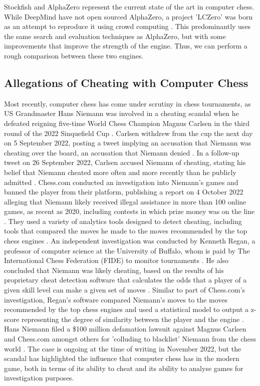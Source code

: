 \documentclass[%
 superscriptaddress,
showpacs,preprintnumbers,
 amsmath,
 amssymb,
 aps,
 pra,
showkeys,
onecolumn,
notitlepage,
11pt,
tightenlines      %
]{revtex4-1}
\begin{document}
Stockfish and AlphaZero represent the current state of the art in computer chess. While DeepMind have not open sourced AlphaZero, a project 'LCZero' was born as an attempt to reproduce it using crowd computing \cite{maharaj2022chess}. This predominantly uses the same search and evaluation techniques as AlphaZero, but with some improvements that improve the strength of the engine. Thus, we can perform a rough comparison between these two engines.

\subsection{Allegations of Cheating with Computer Chess}
Most recently, computer chess has come under scrutiny in chess tournaments, as US Grandmaster Hans Niemann was involved in a cheating scandal when he defeated reigning five-time World Chess Champion Magnus Carlsen in the third round of the 2022 Sinquefield Cup \cite{niemannDefeatsCarlsen}. Carlsen withdrew from the cup the next day on 5 September 2022, posting a tweet implying an accusation that Niemann was cheating over the board, an accusation that Niemann denied \cite{niemannCheatingAllegations}. In a follow-up tweet on 26 September 2022, Carlsen accused Niemann of cheating, stating his belief that Niemann cheated more often and more recently than he publicly admitted \cite{niemannCheatingAllegations2}. Chess.com conducted an investigation into Niemann's games and banned the player from their platform, publishing a report on 4 October 2022 alleging that Niemann likely received illegal assistance in more than 100 online games, as recent as 2020, including contests in which prize money was on the line \cite{niemannCheatingChessComReport}. They used a variety of analytics tools designed to detect cheating, including tools that compared the moves he made to the moves recommended by the top chess engines \cite{niemannCheatingChessComReport}. An independent investigation was conducted by Kenneth Regan, a professor of computer science at the University of Buffalo, whom is paid by The International Chess Federation (FIDE) to monitor tournaments \cite{niemannCheatingReganReport}. He also concluded that Niemann was likely cheating, based on the results of his proprietary cheat detection software that calculates the odds that a player of a given skill level can make a given set of moves \cite{niemannCheatingReganReport}. Similar to part of Chess.com's investigation, Regan's software compared Niemann's moves to the moves recommended by the top chess engines and used a statistical model to output a z-score representing the degree of similarity between the player and the engine \cite{niemannCheatingReganReport}. Hans Niemann filed a \$100 million defamation lawsuit against Magnus Carlsen and Chess.com amongst others for 'colluding to blacklist' Niemann from the chess world \cite{niemannCheatingDefamationLawsuit}. The case is ongoing at the time of writing in November 2022, but the scandal has highlighted the influence that computer chess has in the modern game, both in terms of its ability to cheat and its ability to analyse games for investigation purposes.
\end{document}
